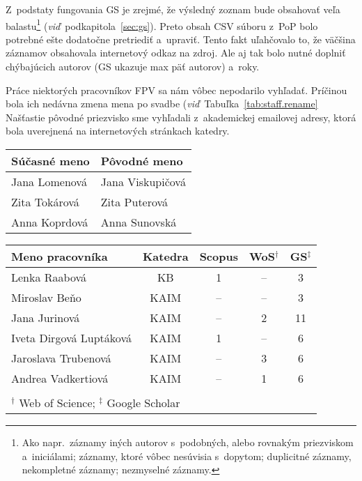Z~podstaty fungovania GS je zrejmé, že výsledný zoznam bude obsahovať veľa
balastu\footnote{Ako napr.~záznamy iných autorov s~podobných, alebo rovnakým
  priezviskom a~iniciálami; záznamy, ktoré vôbec nesúvisia s~dopytom; duplicitné
  záznamy, nekompletné záznamy; nezmyselné záznamy.}
(\emph{viď}~podkapitola~\ref{sec:gs}).  Preto obsah CSV súboru z~PoP bolo
potrebné ešte dodatočne pretriediť a~upraviť.  Tento fakt uľahčovalo to, že
väčšina záznamov obsahovala internetový odkaz na zdroj.  Ale aj tak bolo nutné
doplniť chýbajúcich autorov (GS ukazuje max päť autorov) a~roky.

Práce niektorých pracovníkov FPV sa nám vôbec nepodarilo vyhľadať.  Príčinou
bola ich nedávna zmena mena po svadbe (\emph{viď}~Tabuľka~\ref{tab:staff.rename}
Našťastie pôvodné priezvisko sme vyhľadali z~akademickej emailovej adresy, ktorá
bola uverejnená na internetových stránkach katedry.

\begin{SCtable}
  \centering\small
  \caption[Mená pracovníkov FPV, u~ktorých došlo k~zmene priezviska]%
  {Zoznam pracovníkov FPV, u~ktorých došlo k~zmene priezviska.  Pôvodné
    priezvisko sme vyhľadali z~akademickej emailovej adresy.}
  \label{tab:staff.rename}
  \begin{tabular}{ll}
    \toprule
    Súčasné meno & Pôvodné meno \\
    \midrule
    Jana Lomenová & Jana Viskupičová \\
    Zita Tokárová & Zita Puterová    \\
    Anna Koprdová & Anna Sunovská    \\
    \bottomrule
  \end{tabular}
\end{SCtable}

\begin{SCtable}
  \centering\small
  \caption[Mená pracovníkov FPV, u ktorých sa nám nepodarilo získať všetky dáta]%
  {Zoznam Pracovníkov FPV, pre ktorých sa nepodarilo získať z~niektorých
    citačných registrov žiadne dáta.  V~posledných troch stĺpcoch je uvedený
    počet publikácií, ktoré sa nám podarilo získať.}
  \label{tab:staff.missing}
  \begin{tabular}{lcccc}
    \toprule
    Meno pracovníka & Katedra & Scopus & WoS$^\dagger$ & GS$^\ddagger$ \\
    \midrule
    Lenka Raabová           &  KB  & 1  & --  & 3  \\
    Miroslav Beňo           & KAIM & -- & --  & 3  \\
    Jana Jurinová           & KAIM & -- & 2   & 11 \\
    Iveta Dirgová Luptáková & KAIM & 1  & --  & 6  \\
    Jaroslava Trubenová     & KAIM & -- & 3   & 6  \\
    Andrea Vadkertiová      & KAIM & -- & 1   & 6  \\
    \bottomrule \\[-2ex]
    \multicolumn{5}{l}{\footnotesize $^\dagger$ Web of Science; $^\ddagger$ Google Scholar}
  \end{tabular}
\end{SCtable}


